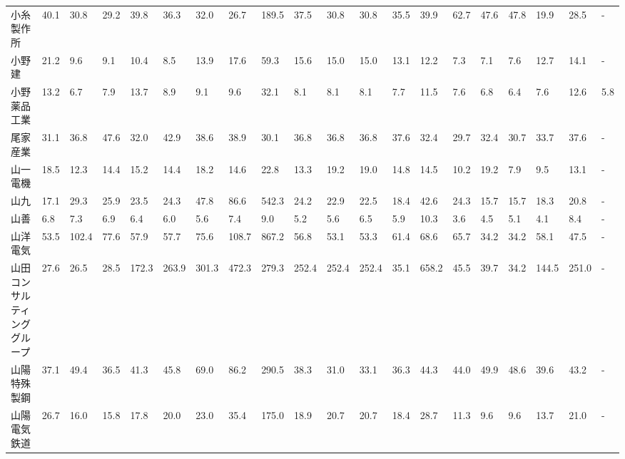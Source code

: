 \begin{tabular}{llllllllllllllllllll}
小糸製作所           &   40.1 &   30.8 &      29.2 &      39.8 &       36.3 &    32.0 &    26.7 &    189.5 &    37.5 &    30.8 &   30.8 &   35.5 &    39.9 &    62.7 &    47.6 &   47.8 &   19.9 &    28.5 &      - \\
小野建             &   21.2 &    9.6 &       9.1 &      10.4 &        8.5 &    13.9 &    17.6 &     59.3 &    15.6 &    15.0 &   15.0 &   13.1 &    12.2 &     7.3 &     7.1 &    7.6 &   12.7 &    14.1 &      - \\
小野薬品工業          &   13.2 &    6.7 &       7.9 &      13.7 &        8.9 &     9.1 &     9.6 &     32.1 &     8.1 &     8.1 &    8.1 &    7.7 &    11.5 &     7.6 &     6.8 &    6.4 &    7.6 &    12.6 &    5.8 \\
尾家産業            &   31.1 &   36.8 &      47.6 &      32.0 &       42.9 &    38.6 &    38.9 &     30.1 &    36.8 &    36.8 &   36.8 &   37.6 &    32.4 &    29.7 &    32.4 &   30.7 &   33.7 &    37.6 &      - \\
山一電機            &   18.5 &   12.3 &      14.4 &      15.2 &       14.4 &    18.2 &    14.6 &     22.8 &    13.3 &    19.2 &   19.0 &   14.8 &    14.5 &    10.2 &    19.2 &    7.9 &    9.5 &    13.1 &      - \\
山九              &   17.1 &   29.3 &      25.9 &      23.5 &       24.3 &    47.8 &    86.6 &    542.3 &    24.2 &    22.9 &   22.5 &   18.4 &    42.6 &    24.3 &    15.7 &   15.7 &   18.3 &    20.8 &      - \\
山善              &    6.8 &    7.3 &       6.9 &       6.4 &        6.0 &     5.6 &     7.4 &      9.0 &     5.2 &     5.6 &    6.5 &    5.9 &    10.3 &     3.6 &     4.5 &    5.1 &    4.1 &     8.4 &      - \\
山洋電気            &   53.5 &  102.4 &      77.6 &      57.9 &       57.7 &    75.6 &   108.7 &    867.2 &    56.8 &    53.1 &   53.3 &   61.4 &    68.6 &    65.7 &    34.2 &   34.2 &   58.1 &    47.5 &      - \\
山田コンサルティンググループ  &   27.6 &   26.5 &      28.5 &     172.3 &      263.9 &   301.3 &   472.3 &    279.3 &   252.4 &   252.4 &  252.4 &   35.1 &   658.2 &    45.5 &    39.7 &   34.2 &  144.5 &   251.0 &      - \\
山陽特殊製鋼          &   37.1 &   49.4 &      36.5 &      41.3 &       45.8 &    69.0 &    86.2 &    290.5 &    38.3 &    31.0 &   33.1 &   36.3 &    44.3 &    44.0 &    49.9 &   48.6 &   39.6 &    43.2 &      - \\
山陽電気鉄道          &   26.7 &   16.0 &      15.8 &      17.8 &       20.0 &    23.0 &    35.4 &    175.0 &    18.9 &    20.7 &   20.7 &   18.4 &    28.7 &    11.3 &     9.6 &    9.6 &   13.7 &    21.0 &      - \\

\end{tabular}
